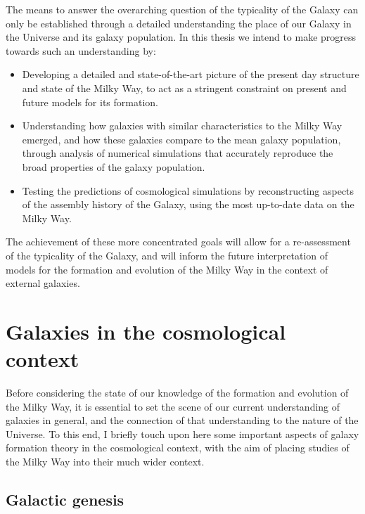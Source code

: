 The means to answer the overarching question of the typicality of the Galaxy can only be established through a detailed understanding the place of our Galaxy in the Universe and its galaxy population. In this thesis we intend to make progress towards such an understanding by:
\begin{itemize}
    \item Developing a detailed and state-of-the-art picture of the present day structure and state of the Milky Way, to act as a stringent constraint on present and future models for its formation.
    \item Understanding how galaxies with similar characteristics to the Milky Way emerged, and how these galaxies compare to the mean galaxy population, through analysis of numerical simulations that accurately reproduce the broad properties of the galaxy population.
    \item Testing the predictions of cosmological simulations by reconstructing aspects of the assembly history of the Galaxy, using the most up-to-date data on the Milky Way.
\end{itemize}
The achievement of these more concentrated goals will allow for a re-assessment of the typicality of the Galaxy, and will inform the future interpretation of models for the formation and evolution of the Milky Way in the context of external galaxies.

\section{Galaxies in the cosmological context}

Before considering the state of our knowledge of the formation and evolution of the Milky Way, it is essential to set the scene of our current understanding of galaxies in general, and the connection of that understanding to the nature of the Universe. To this end, I briefly touch upon here some important aspects of galaxy formation theory in the cosmological context, with the aim of placing studies of the Milky Way into their much wider context.

\subsection{Galactic genesis}

